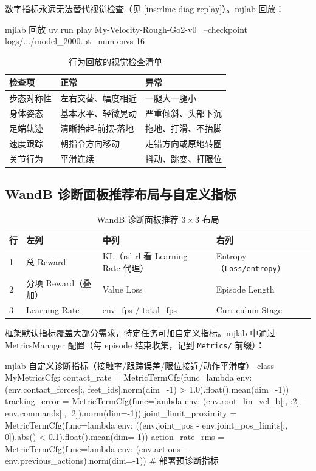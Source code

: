 数字指标永远无法替代视觉检查（见 \cref{ins:rlmc-diag-replay}）。mjlab 回放：

\begin{codebox}[bash]{mjlab 回放}
uv run play My-Velocity-Rough-Go2-v0 \
  --checkpoint logs/.../model_2000.pt --num-envs 16
\end{codebox}

\begin{table}[H]
\centering
\caption{行为回放的视觉检查清单}
\label{tab:rlmc-diag-visual}
\begin{tabular}{p{2.6cm}p{4.6cm}p{4.6cm}}
\hline
检查项 & 正常 & 异常 \\
\hline
步态对称性 & 左右交替、幅度相近 & 一腿大一腿小 \\
身体姿态 & 基本水平、轻微晃动 & 严重倾斜、头部下沉 \\
足端轨迹 & 清晰抬起-前摆-落地 & 拖地、打滑、不抬脚 \\
速度跟踪 & 朝指令方向移动 & 走错方向或原地转圈 \\
关节行为 & 平滑连续 & 抖动、跳变、打限位 \\
\hline
\end{tabular}
\end{table}

\subsection{WandB 诊断面板推荐布局与自定义指标}

\begin{table}[H]
\centering
\caption{WandB 诊断面板推荐 $3\times3$ 布局}
\label{tab:rlmc-diag-panel}
\begin{tabular}{p{1.0cm}p{3.4cm}p{3.4cm}p{3.4cm}}
\hline
行 & 左列 & 中列 & 右列 \\
\hline
1 & 总 Reward & KL（rsl-rl 看 Learning Rate 代理） & Entropy（\texttt{Loss/entropy}） \\
2 & 分项 Reward（叠加） & Value Loss & Episode Length \\
3 & Learning Rate & env\_fps / total\_fps & Curriculum Stage \\
\hline
\end{tabular}
\end{table}

框架默认指标覆盖大部分需求，特定任务可加自定义指标。mjlab 中通过 MetricsManager 配置（每 episode 结束收集，记到 \verb|Metrics/| 前缀）：

\begin{codebox}[Python]{mjlab 自定义诊断指标（接触率/跟踪误差/限位接近/动作平滑度）}
class MyMetricsCfg:
    contact_rate = MetricTermCfg(func=lambda env:
        (env.contact_forces[:, feet_ids].norm(dim=-1) > 1.0).float().mean(dim=-1))
    tracking_error = MetricTermCfg(func=lambda env:
        (env.root_lin_vel_b[:, :2] - env.commands[:, :2]).norm(dim=-1))
    joint_limit_proximity = MetricTermCfg(func=lambda env:
        ((env.joint_pos - env.joint_pos_limits[:, 0]).abs() < 0.1).float().mean(dim=-1))
    action_rate_rms = MetricTermCfg(func=lambda env:
        (env.actions - env.previous_actions).norm(dim=-1))  # 部署预诊断指标
\end{codebox}

